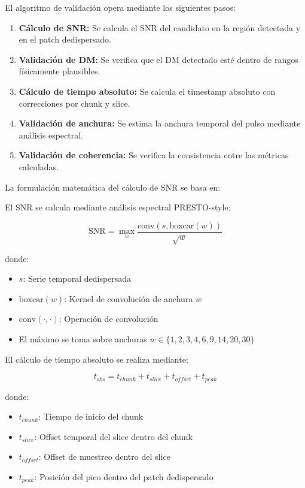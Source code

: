 El algoritmo de validación opera mediante los siguientes pasos:

\begin{enumerate}
    \item \textbf{Cálculo de SNR:} Se calcula el SNR del candidato en la región detectada y en el patch dedispersado.
    \item \textbf{Validación de DM:} Se verifica que el DM detectado esté dentro de rangos físicamente plausibles.
    \item \textbf{Cálculo de tiempo absoluto:} Se calcula el timestamp absoluto con correcciones por chunk y slice.
    \item \textbf{Validación de anchura:} Se estima la anchura temporal del pulso mediante análisis espectral.
    \item \textbf{Validación de coherencia:} Se verifica la consistencia entre las métricas calculadas.
\end{enumerate}

La formulación matemática del cálculo de SNR se basa en:

El SNR se calcula mediante análisis espectral PRESTO-style:

\[
\text{SNR} = \max_w \frac{\text{conv}(s, \text{boxcar}(w))}{\sqrt{w}}
\]

donde:
\begin{itemize}
    \item $s$: Serie temporal dedispersada
    \item $\text{boxcar}(w)$: Kernel de convolución de anchura $w$
    \item $\text{conv}(\cdot, \cdot)$: Operación de convolución
    \item El máximo se toma sobre anchuras $w \in \{1, 2, 3, 4, 6, 9, 14, 20, 30\}$
\end{itemize}

El cálculo de tiempo absoluto se realiza mediante:

\[
t_{abs} = t_{chunk} + t_{slice} + t_{offset} + t_{peak}
\]

donde:
\begin{itemize}
    \item $t_{chunk}$: Tiempo de inicio del chunk
    \item $t_{slice}$: Offset temporal del slice dentro del chunk
    \item $t_{offset}$: Offset de muestreo dentro del slice
    \item $t_{peak}$: Posición del pico dentro del patch dedispersado
\end{itemize}

